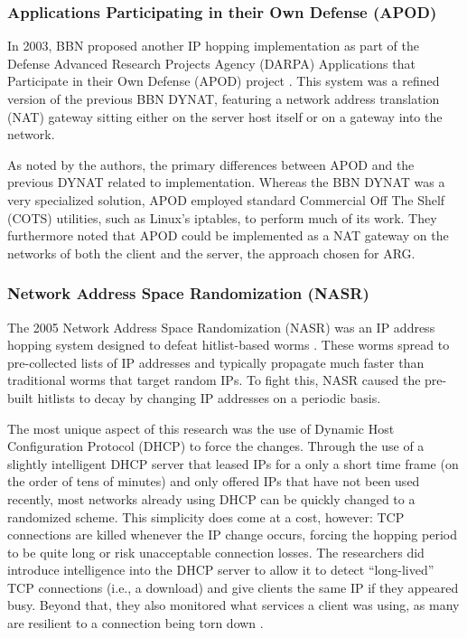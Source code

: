 \subsubsection{Applications Participating in their Own Defense (APOD)}
\par In 2003, BBN proposed another IP hopping implementation as part of the Defense Advanced Research Projects Agency (DARPA) Applications that Participate in their Own Defense (APOD) project \cite{APOD}. This system was a refined version of the previous BBN DYNAT, featuring a network address translation (NAT) gateway sitting either on the server host itself or on a gateway into the network.

\par As noted by the authors, the primary differences between APOD and the previous DYNAT related to implementation. Whereas the BBN DYNAT was a very specialized solution, APOD employed standard Commercial Off The Shelf (COTS) utilities, such as Linux's iptables, to perform much of its work. They furthermore noted that APOD could be implemented as a NAT gateway on the networks of both the client and the server, the approach chosen for ARG.

\subsubsection{Network Address Space Randomization (NASR)}
\par The 2005 Network Address Space Randomization (NASR) was an IP address hopping system designed to defeat hitlist-based worms \cite{NASR}. These worms spread to pre-collected lists of IP addresses and typically propagate much faster than traditional worms that target random IPs. To fight this, NASR caused the pre-built hitlists to decay by changing IP addresses on a periodic basis.

\par The most unique aspect of this research was the use of Dynamic Host Configuration Protocol (DHCP) to force the changes. Through the use of a slightly intelligent DHCP server that leased IPs for a only a short time frame (on the order of tens of minutes) and only offered IPs that have not been used recently, most networks already using DHCP can be quickly changed to a randomized scheme. This simplicity does come at a cost, however: TCP connections are killed whenever the IP change occurs, forcing the hopping period to be quite long or risk unacceptable connection losses. The researchers did introduce intelligence into the DHCP server to allow it to detect ``long-lived'' TCP connections (i.e., a download) and give clients the same IP if they appeared busy. Beyond that, they also monitored what services a client was using, as many are resilient to a connection being torn down \cite{NASR}.

